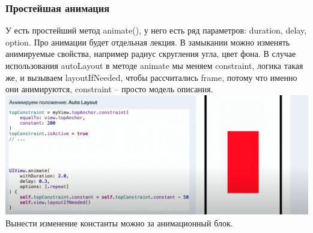 \documentclass{article}
\begin{document}
    \subsubsection{Простейшая анимация}
    У  есть простейший метод animate(), у него есть ряд параметров: duration, delay, option. Про анимации будет отдельная лекция. В замыкании можно изменять анимируемые свойства, например радиус скругления угла, цвет фона.
    \newline
    В случае использования autoLayout в методе animate мы меняем constraint, логика такая же, и вызываем layoutIfNeeded, чтобы рассчитались frame, потому что именно они анимируются, constraint -- просто модель описания. 
    \newline
    \includegraphics[scale = 0.2]{pic/Снимок экрана 2023-08-01 в 00.14.33.png}
    \newline
    Вынести изменение константы можно за анимационный блок. 
\end{document}
